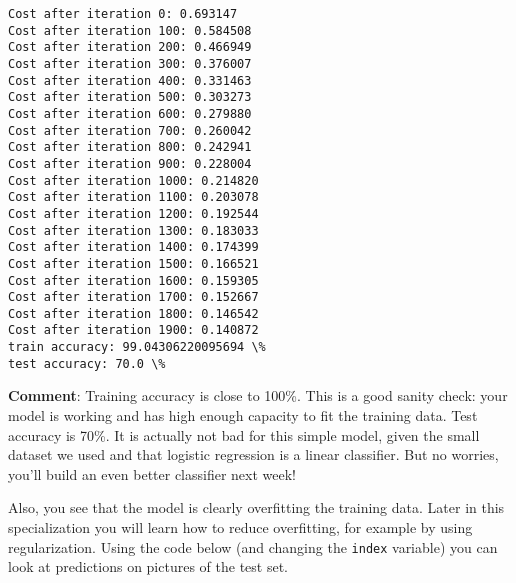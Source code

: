 \documentclass[11pt]{article}
\begin{document}
    \begin{Verbatim}[commandchars=\\\{\}]
Cost after iteration 0: 0.693147
Cost after iteration 100: 0.584508
Cost after iteration 200: 0.466949
Cost after iteration 300: 0.376007
Cost after iteration 400: 0.331463
Cost after iteration 500: 0.303273
Cost after iteration 600: 0.279880
Cost after iteration 700: 0.260042
Cost after iteration 800: 0.242941
Cost after iteration 900: 0.228004
Cost after iteration 1000: 0.214820
Cost after iteration 1100: 0.203078
Cost after iteration 1200: 0.192544
Cost after iteration 1300: 0.183033
Cost after iteration 1400: 0.174399
Cost after iteration 1500: 0.166521
Cost after iteration 1600: 0.159305
Cost after iteration 1700: 0.152667
Cost after iteration 1800: 0.146542
Cost after iteration 1900: 0.140872
train accuracy: 99.04306220095694 \%
test accuracy: 70.0 \%
    \end{Verbatim}

    \textbf{Comment}: Training accuracy is close to 100\%. This is a good
sanity check: your model is working and has high enough capacity to fit
the training data. Test accuracy is 70\%. It is actually not bad for
this simple model, given the small dataset we used and that logistic
regression is a linear classifier. But no worries, you'll build an even
better classifier next week!

Also, you see that the model is clearly overfitting the training data.
Later in this specialization you will learn how to reduce overfitting,
for example by using regularization. Using the code below (and changing
the \texttt{index} variable) you can look at predictions on pictures of
the test set.
\end{document}
